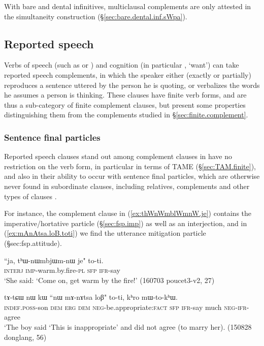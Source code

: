 With bare and dental infinitives, multiclausal complements are only attested in the simultaneity construction (§\ref{sec:bare.dental.inf.sWpa}).

\subsection{Reported speech} \label{sec:reported.speech}
Verbs of speech (such as  or ) and cognition (in particular , `want') can take reported speech complements, in which the speaker either (exactly or partially) reproduces a sentence uttered by the person he is quoting, or verbalizes the words he assumes a person is thinking. These clauses have finite verb forms, and are thus a sub-category of finite complement clauses, but present some properties distinguishing them from the complements studied in §\ref{sec:finite.complement}.

\subsubsection{Sentence final particles} \label{sec:reported.speech.sfp}
Reported speech clauses stand out among complement clauses in have no restriction on the verb form, in particular in terms of TAME (§\ref{sec:TAM.finite}), and also in their ability to occur with sentence final particles, which are otherwise never found in subordinate clauses, including relatives, complements and other types of clauses . 

For instance, the complement clause in (\ref{ex:thWnWmblWmnW.je}) contains the imperative/hortative particle  (§\ref{sec:fsp.imp}) as well as an interjection, and in (\ref{ex:mAnAtsa.loB.toti}) we find the utterance mitigation particle  (§{sec:fsp.attitude}).   

 \begin{exe}
\ex \label{ex:thWnWmblWmnW.je}
 \gll ``ja, tʰɯ-nɯmbjɯm-nɯ je" to-ti. \\
 \textsc{interj} \textsc{imp}-warm.by.fire-\textsc{pl} \textsc{sfp} \textsc{ifr}-say \\
 \glt `She said: `Come on, get warm by the fire!' (160703 poucet3-v2, 27)
 \end{exe} 
 
 \begin{exe}
\ex \label{ex:mAnAtsa.loB.toti}
 \gll tɤ-tɕɯ nɯ kɯ ``nɯ mɤ-nɤtsa loβ" to-ti, kʰro mɯ-to-kʰɯ. \\
 \textsc{indef}.\textsc{poss}-son \textsc{dem} \textsc{erg} \textsc{dem} \textsc{neg}-be.appropriate:\textsc{fact} \textsc{sfp} \textsc{ifr}-say much \textsc{neg}-\textsc{ifr}-agree \\
 \glt `The boy said `This is inappropriate' and did not agree (to marry her). (150828 donglang, 56)
\end{exe} 
  
